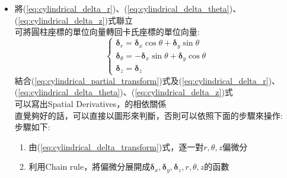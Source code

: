 \documentclass[../main.tex]{subfiles}
\begin{document}
\begin{itemize}
\begin{itemize}
\begin{align}
        (\div 1)\implies & \boxed{\bm\delta_z = \bm\delta_z} \label{eq:cylindrical_delta_z}
      \end{align}
      最後整理出圓柱座標的$\nabla$:(把剛剛除的長度乘回去)
      \begin{equation}
        \boxed{
        \nabla =
        \bm\delta_r \left(\frac{\partial}{\partial r}\right)_{\theta z} +
        \bm\delta_\theta \frac{1}{r}\left(\frac{\partial}{\partial \theta}\right)_{rz} +
        \bm\delta_z \left(\frac{\partial}{\partial z}\right)_{r\theta}
        } \label{eq:cylindrical_nabla}
      \end{equation}
      右手性的部分，在定義$\bm\delta_x,\bm\delta_y,\bm\delta_z$時已經保證了\\
      至於正交性，只要$\nabla$按照此方式被單位向量代換後，不再有交叉項\\
      例如$\frac{\partial }{\partial r}$前面不會有$\bm\delta_\theta$或$\bm\delta_z$，即可保證正交性\\
      (可以允許$r,\theta,z$出現，因為那是該位置的資訊，不是方向向量)
    \item 將(\ref{eq:cylindrical_delta_r})、(\ref{eq:cylindrical_delta_theta})、(\ref{eq:cylindrical_delta_z})式聯立\\
      可將圓柱座標的單位向量轉回卡氏座標的單位向量:
      \begin{equation}
        \boxed{
        \begin{cases}
          \bm\delta_r = \bm\delta_x \cos\theta + \bm\delta_y \sin\theta \\
          \bm\delta_\theta = -\bm\delta_x \sin\theta + \bm\delta_y \cos\theta \\
          \bm\delta_z = \bm\delta_z
        \end{cases}
        } \label{eq:cylindrical_delta_transform}
      \end{equation}
      結合(\ref{eq:cylindrical_partial_transform})式及(\ref{eq:cylindrical_delta_r})、(\ref{eq:cylindrical_delta_theta})、(\ref{eq:cylindrical_delta_z})式\\
      可以寫出Spatial Derivatives，的相依關係\\
      直覺夠好的話，可以直接以圖形來判斷，否則可以依照下面的步驟來操作:\\
      步驟如下:
      \begin{enumerate}
        \item 由(\ref{eq:cylindrical_delta_transform})式，逐一對$r,\theta,z$偏微分
        \item 利用Chain rule，將偏微分展開成$\bm\delta_x,\bm\delta_y,\bm\delta_z,r,\theta,z$的函數

\end{enumerate}
\end{itemize}
\end{itemize}
\end{document}
